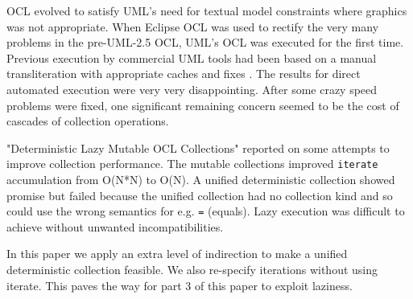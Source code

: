\documentclass[
]{ceurart}
\begin{document}
OCL \cite{OCL-2.4} evolved to satisfy UML's \cite{UML-2.5} need for textual model constraints where graphics was not appropriate. When Eclipse OCL was used to rectify the very many problems \cite{wilke2011uml} in the pre-UML-2.5 OCL, UML's OCL was executed for the first time. Previous execution by commercial UML tools had been based on a manual transliteration with appropriate caches and fixes . The results for direct automated execution were very very disappointing. After some crazy speed problems were fixed, one significant remaining concern seemed to be the cost of cascades of collection operations.

"Deterministic Lazy Mutable OCL Collections" \cite{willink2017deterministic} reported on some attempts to improve collection performance. The mutable collections improved \verb!iterate! accumulation from O(N*N) to O(N). A unified deterministic collection showed promise but failed because the unified collection had no collection kind and so could use the wrong semantics for e.g. \verb!=! (equals). Lazy execution was difficult to achieve without unwanted incompatibilities.

In this paper we apply an extra level of indirection \cite{lampson1993principles} to make a unified deterministic collection feasible.  We also re-specify iterations without using iterate. This paves the way for part 3 of this paper to exploit laziness.



\end{document}

